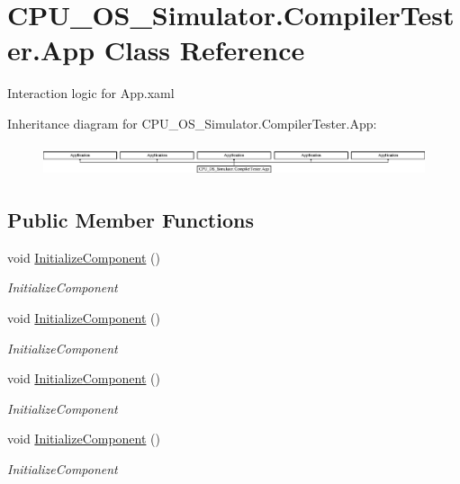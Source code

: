 \hypertarget{class_c_p_u___o_s___simulator_1_1_compiler_tester_1_1_app}{}\section{C\+P\+U\+\_\+\+O\+S\+\_\+\+Simulator.\+Compiler\+Tester.\+App Class Reference}
\label{class_c_p_u___o_s___simulator_1_1_compiler_tester_1_1_app}


Interaction logic for App.\+xaml  


Inheritance diagram for C\+P\+U\+\_\+\+O\+S\+\_\+\+Simulator.\+Compiler\+Tester.\+App\+:\begin{figure}[H]
\begin{center}
\leavevmode
\includegraphics[height=0.914286cm]{class_c_p_u___o_s___simulator_1_1_compiler_tester_1_1_app}
\end{center}
\end{figure}
\subsection*{Public Member Functions}
\begin{DoxyCompactItemize}
\item 
void \hyperlink{class_c_p_u___o_s___simulator_1_1_compiler_tester_1_1_app_a7d535b75c41bf3e0736a88743bec2296}{Initialize\+Component} ()
\begin{DoxyCompactList}\small\item\em Initialize\+Component \end{DoxyCompactList}\item 
void \hyperlink{class_c_p_u___o_s___simulator_1_1_compiler_tester_1_1_app_a7d535b75c41bf3e0736a88743bec2296}{Initialize\+Component} ()
\begin{DoxyCompactList}\small\item\em Initialize\+Component \end{DoxyCompactList}\item 
void \hyperlink{class_c_p_u___o_s___simulator_1_1_compiler_tester_1_1_app_a7d535b75c41bf3e0736a88743bec2296}{Initialize\+Component} ()
\begin{DoxyCompactList}\small\item\em Initialize\+Component \end{DoxyCompactList}\item 
void \hyperlink{class_c_p_u___o_s___simulator_1_1_compiler_tester_1_1_app_a7d535b75c41bf3e0736a88743bec2296}{Initialize\+Component} ()
\begin{DoxyCompactList}\small\item\em Initialize\+Component \end{DoxyCompactList}\end{DoxyCompactItemize}
